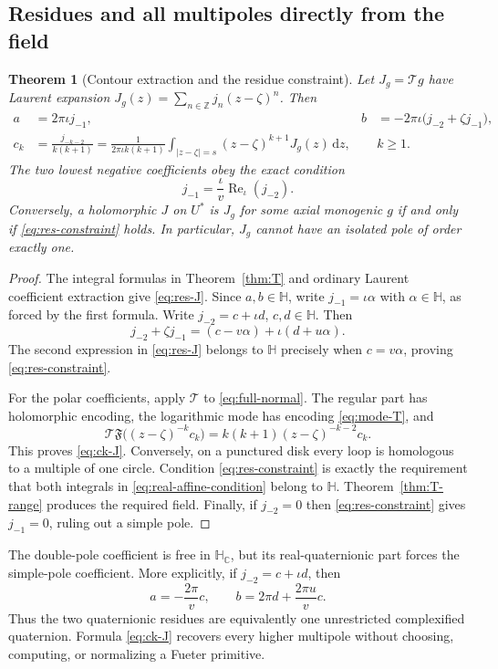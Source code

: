 \documentclass[11pt,a4paper]{article}
\numberwithin{equation}{section}
\newtheorem{theorem}{Theorem}[section]
\theoremstyle{definition}
\theoremstyle{remark}
\newcommand{\C}{\mathbb C}
\newcommand{\HH}{\mathbb H}
\newcommand{\HC}{\mathbb H_{\C}}
\newcommand{\Fu}{\mathfrak F}
\newcommand{\ReC}{\operatorname{Re}_{\iota}}
\newcommand{\dd}{\,\mathrm d}
\newcommand{\T}{\mathcal T}
\newcommand{\Z}{\mathbb Z}
\begin{document}
\subsection{Residues and all multipoles directly from the field}
\begin{theorem}[Contour extraction and the residue constraint]
\label{thm:res-encoding}
Let $J_g=\T g$ have Laurent expansion
$J_g(z)=\sum_{n\in\Z}j_n(z-\zeta)^n$. Then
\begin{align}
 a&=2\pi\iota j_{-1},&
 b&=-2\pi\iota\bigl(j_{-2}+\zeta j_{-1}\bigr),
 \label{eq:res-J}\\
 c_k&=\frac{j_{-k-2}}{k(k+1)}
 =\frac1{2\pi\iota k(k+1)}
    \int_{|z-\zeta|=s}(z-\zeta)^{k+1}J_g(z)\dd z,
 &&k\ge1.\label{eq:ck-J}
\end{align}
The two lowest negative coefficients obey the exact condition
\begin{equation}\label{eq:res-constraint}
 \boxed{\displaystyle
 j_{-1}=\frac{\iota}{v}\ReC(j_{-2}).}
\end{equation}
Conversely, a holomorphic $J$ on $U^*$ is $J_g$ for some axial
monogenic $g$ if and only if \eqref{eq:res-constraint} holds.
In particular, $J_g$ cannot have an isolated pole of order exactly one.
\end{theorem}
\begin{proof}
The integral formulas in Theorem~\ref{thm:T} and ordinary Laurent
coefficient extraction give \eqref{eq:res-J}. Since $a,b\in\HH$, write
$j_{-1}=\iota\alpha$ with $\alpha\in\HH$, as forced by the first
formula. Write $j_{-2}=c+\iota d$, $c,d\in\HH$.
Then
\[
 j_{-2}+\zeta j_{-1}=(c-v\alpha)+\iota(d+u\alpha).
\]
The second expression in \eqref{eq:res-J} belongs to $\HH$ precisely
when $c=v\alpha$, proving \eqref{eq:res-constraint}.

For the polar coefficients, apply $\T$ to \eqref{eq:full-normal}.
The regular part has holomorphic encoding, the logarithmic mode has
encoding \eqref{eq:mode-T}, and
\[
 \T\Fu\bigl((z-\zeta)^{-k}c_k\bigr)
 =k(k+1)(z-\zeta)^{-k-2}c_k.
\]
This proves \eqref{eq:ck-J}. Conversely, on a punctured disk every loop
is homologous to a multiple of one circle. Condition
\eqref{eq:res-constraint} is exactly the requirement that both integrals
in \eqref{eq:real-affine-condition} belong to $\HH$.
Theorem~\ref{thm:T-range} produces the required field.
Finally, if $j_{-2}=0$ then \eqref{eq:res-constraint} gives $j_{-1}=0$,
ruling out a simple pole.
\end{proof}

The double-pole coefficient is free in $\HC$, but its real-quaternionic
part forces the simple-pole coefficient. More explicitly, if
$j_{-2}=c+\iota d$, then
\begin{equation}\label{eq:res-from-double}
 a=-\frac{2\pi}{v}c,\qquad
 b=2\pi d+\frac{2\pi u}{v}c.
\end{equation}
Thus the two quaternionic residues are equivalently one unrestricted
complexified quaternion. Formula \eqref{eq:ck-J} recovers every higher
multipole without choosing, computing, or normalizing a Fueter primitive.
\end{document}

